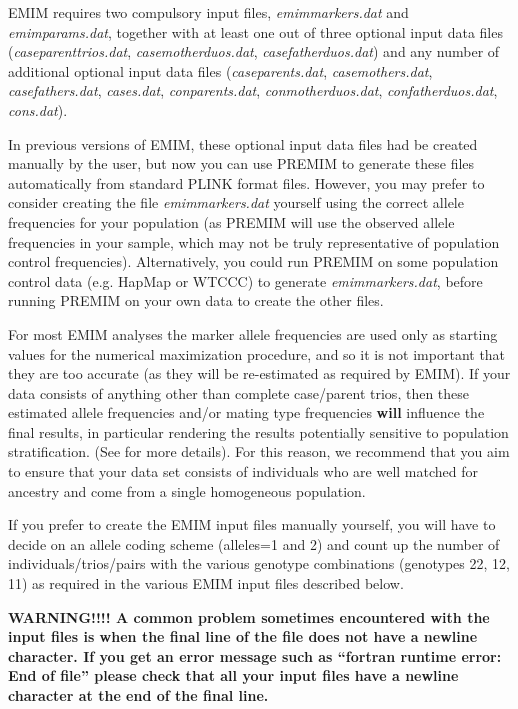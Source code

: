 \documentclass[a4paper,12pt]{article}
\begin{document}
EMIM requires two compulsory input files, {\it emimmarkers.dat} and {\it emimparams.dat}, together with at least one out of three optional input data files ({\it caseparenttrios.dat}, {\it casemotherduos.dat}, {\it casefatherduos.dat}) and any number of additional optional input data files ({\it caseparents.dat}, {\it casemothers.dat}, {\it casefathers.dat}, {\it cases.dat}, {\it conparents.dat}, {\it conmotherduos.dat}, {\it confatherduos.dat}, {\it cons.dat}). 

In previous versions of EMIM, these optional input data files had be created manually by the user, but now you can use PREMIM to generate these files automatically from standard PLINK format files. However, you may prefer to consider creating the file {\it emimmarkers.dat} yourself using the correct allele frequencies for your population (as PREMIM will use the observed allele frequencies in your sample, which may not be truly representative of population control frequencies). Alternatively, you could run PREMIM on some population control data (e.g. HapMap or WTCCC) to generate {\it emimmarkers.dat}, before running PREMIM on your own data to create the other files. 

For most EMIM analyses the marker allele frequencies are used only as starting values for the numerical maximization procedure, and so it is not important that they are too accurate (as they will be re-estimated as required by EMIM). If your data consists of anything other than complete case/parent trios, then these estimated allele frequencies and/or mating type frequencies {\bf will} influence the final results, in particular rendering the results potentially sensitive to population stratification. (See \citet{ainsworth:etal:11} for more details). For this reason, we recommend that you aim to ensure that your data set consists of individuals who are well matched for ancestry and come from a single homogeneous population. 

If you prefer to create the EMIM input files manually yourself, you will have to decide on an allele coding scheme (alleles=1 and 2) and count up the number of individuals/trios/pairs with the various genotype combinations (genotypes 22, 12, 11) as required in the various EMIM input files described below. 

{\bf WARNING!!!! A common problem sometimes encountered with the input files is when the final line of the file does not have a newline character. If you get an error message such as ``fortran runtime error: End of file'' please check that all your input files have a newline character at the end of the final line.} 
\end{document}
